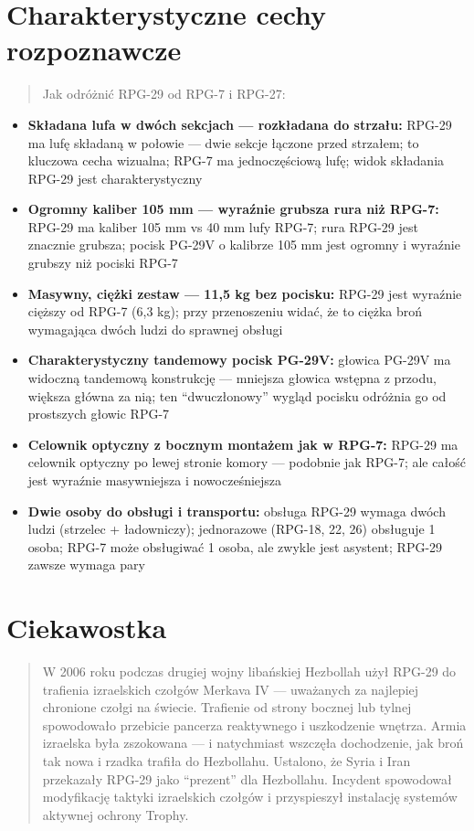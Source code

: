 \documentclass[12pt,openany,oneside]{book}
\providecommand{\tightlist}{%
  \setlength{\itemsep}{0pt}\setlength{\parskip}{0pt}}
\begin{document}
\section{Charakterystyczne cechy
rozpoznawcze}\label{charakterystyczne-cechy-rozpoznawcze-73}

\begin{quote}
Jak odróżnić RPG-29 od RPG-7 i RPG-27:
\end{quote}

\begin{itemize}
\tightlist
\item
  \textbf{Składana lufa w dwóch sekcjach --- rozkładana do strzału:}
  RPG-29 ma lufę składaną w połowie --- dwie sekcje łączone przed
  strzałem; to kluczowa cecha wizualna; RPG-7 ma jednoczęściową lufę;
  widok składania RPG-29 jest charakterystyczny
\item
  \textbf{Ogromny kaliber 105 mm --- wyraźnie grubsza rura niż RPG-7:}
  RPG-29 ma kaliber 105 mm vs 40 mm lufy RPG-7; rura RPG-29 jest
  znacznie grubsza; pocisk PG-29V o kalibrze 105 mm jest ogromny i
  wyraźnie grubszy niż pociski RPG-7
\item
  \textbf{Masywny, ciężki zestaw --- 11,5 kg bez pocisku:} RPG-29 jest
  wyraźnie cięższy od RPG-7 (6,3 kg); przy przenoszeniu widać, że to
  ciężka broń wymagająca dwóch ludzi do sprawnej obsługi
\item
  \textbf{Charakterystyczny tandemowy pocisk PG-29V:} głowica PG-29V ma
  widoczną tandemową konstrukcję --- mniejsza głowica wstępna z przodu,
  większa główna za nią; ten ``dwuczłonowy'' wygląd pocisku odróżnia go
  od prostszych głowic RPG-7
\item
  \textbf{Celownik optyczny z bocznym montażem jak w RPG-7:} RPG-29 ma
  celownik optyczny po lewej stronie komory --- podobnie jak RPG-7; ale
  całość jest wyraźnie masywniejsza i nowocześniejsza
\item
  \textbf{Dwie osoby do obsługi i transportu:} obsługa RPG-29 wymaga
  dwóch ludzi (strzelec + ładowniczy); jednorazowe (RPG-18, 22, 26)
  obsługuje 1 osoba; RPG-7 może obsługiwać 1 osoba, ale zwykle jest
  asystent; RPG-29 zawsze wymaga pary
\end{itemize}

\section{Ciekawostka}\label{ciekawostka-73}

\begin{quote}
W 2006 roku podczas drugiej wojny libańskiej Hezbollah użył RPG-29 do
trafienia izraelskich czołgów Merkava IV --- uważanych za najlepiej
chronione czołgi na świecie. Trafienie od strony bocznej lub tylnej
spowodowało przebicie pancerza reaktywnego i uszkodzenie wnętrza. Armia
izraelska była zszokowana --- i natychmiast wszczęła dochodzenie, jak
broń tak nowa i rzadka trafiła do Hezbollahu. Ustalono, że Syria i Iran
przekazały RPG-29 jako ``prezent'' dla Hezbollahu. Incydent spowodował
modyfikację taktyki izraelskich czołgów i przyspieszył instalację
systemów aktywnej ochrony Trophy.
\end{quote}
\end{document}
